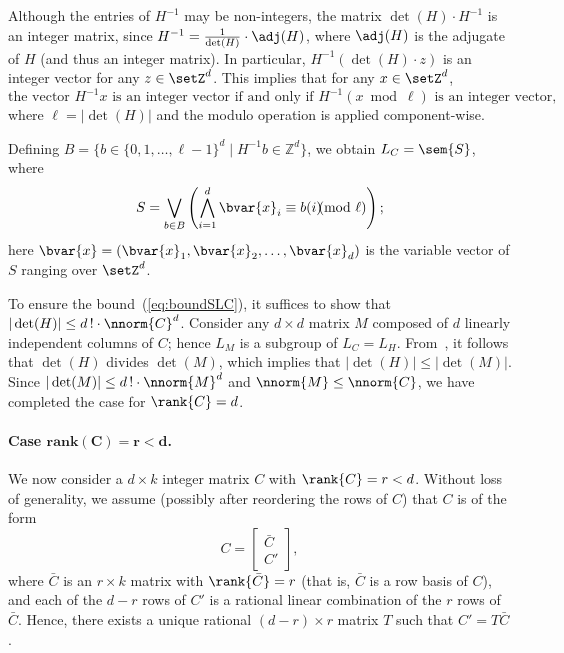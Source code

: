 Although the entries of $H^{-1}$ may be non-integers, the matrix
$\det(H) \cdot H^{-1}$ is an integer matrix, since $H^{-1} =
\frac{1}{\det(H)}\cdot \adj(H)$, where $\adj(H)$ is the adjugate of
$H$ (and thus an integer matrix). In particular, $H^{-1}(\det(H) \cdot
z)$ is an integer vector for any $z \in \setZ^d$. This implies that
for any $x \in \setZ^d$, 
\[
	\text{the vector } H^{-1}x \text{ is an integer vector if and
	only if } H^{-1}(x \bmod \ell) \text{ is an integer vector,}
\]
where $\ell = |\det(H)|$ and the modulo operation is applied component-wise.


Defining $B = \{b \in \{0, 1, \dots, \ell{-}1\}^d \mid H^{-1}b \in \mathbb{Z}^d\}$, we obtain $L_C = \sem{S}$, where 
\[
    S = \bigvee_{b \in B} \left( \bigwedge_{i=1}^d \bvar{x}_i \equiv
    b(i) \!\!\!\! \pmod \ell \right);
\]
here $\bvar{x} = (\bvar{x}_1,\bvar{x}_2, \dots, \bvar{x}_d)$ is the
variable vector of $S$ ranging over $\setZ^d$.

To ensure the bound~(\ref{eq:boundSLC}),
it suffices to show that $|\det(H)|\leq d\,!\cdot\nnorm{C}^d$.
Consider any $d\times d$ matrix $M$ composed of $d$
linearly independent columns of $C$; hence $L_M$ is a subgroup of
$L_C=L_H$.
From~\cite[Chapter 4]{schrijver1986theory}, it follows that $\det(H)$
divides $\det(M)$, which implies that $|\det(H)|\leq |\det(M)|$.
Since $|\det(M)|\leq d\,!\cdot\nnorm{M}^d$ and
$\nnorm{M}\leq \nnorm{C}$, we have completed the case for
$\rank{C}=d$.

\paragraph{Case $\bm{\text{rank}(C)=r<d}$.}
We now consider a $d \times k$ integer matrix $C$ with $\rank{C} = r < d$. Without loss of generality, we assume (possibly after reordering the rows of $C$) that $C$ is of the form
\[
	C = \begin{bmatrix} \bar{C} \\ C' \end{bmatrix},
\]
where $\bar{C}$ is an $r \times k$ matrix with $\rank{\bar{C}} = r$
(that is, $\bar{C}$ is a row basis of $C$), and each of the $d-r$ rows
of $C'$ is a rational linear combination of the $r$ rows of $\bar{C}$.
Hence, there exists a unique rational $(d-r) \times r$ matrix $T$ such
that $C' = T\bar{C}$.

